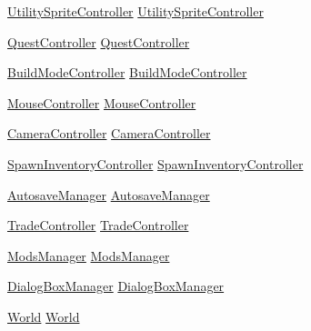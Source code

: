 \begin{DoxyCompactItemize}
\item 
\hyperlink{class_utility_sprite_controller}{Utility\+Sprite\+Controller} \hyperlink{class_world_controller_ade5c8157ae83db0367c11f9e8bbb5fb9}{Utility\+Sprite\+Controller}
\item 
\hyperlink{class_quest_controller}{Quest\+Controller} \hyperlink{class_world_controller_a8bd360e6ff51d5b2d3dffd19beafb0af}{Quest\+Controller}
\item 
\hyperlink{class_build_mode_controller}{Build\+Mode\+Controller} \hyperlink{class_world_controller_a5d914a05b2ad0e14c7612f48e850d91a}{Build\+Mode\+Controller}
\item 
\hyperlink{class_mouse_controller}{Mouse\+Controller} \hyperlink{class_world_controller_abf96a102fb4ae34e384a5970cd590c0b}{Mouse\+Controller}
\item 
\hyperlink{class_camera_controller}{Camera\+Controller} \hyperlink{class_world_controller_a16578baf61da3e9d18e543280d2b1f86}{Camera\+Controller}
\item 
\hyperlink{class_spawn_inventory_controller}{Spawn\+Inventory\+Controller} \hyperlink{class_world_controller_a06f2556c0b263655566adb7b58bbd061}{Spawn\+Inventory\+Controller}
\item 
\hyperlink{class_autosave_manager}{Autosave\+Manager} \hyperlink{class_world_controller_a47f20dc0e6593e64950ab9f6c0a2744d}{Autosave\+Manager}
\item 
\hyperlink{class_trade_controller}{Trade\+Controller} \hyperlink{class_world_controller_a4a1277c140cc46e9578809ecbd4c192d}{Trade\+Controller}
\item 
\hyperlink{class_mods_manager}{Mods\+Manager} \hyperlink{class_world_controller_a8d7943508d1d026430d6e57a3fda805a}{Mods\+Manager}
\item 
\hyperlink{class_dialog_box_manager}{Dialog\+Box\+Manager} \hyperlink{class_world_controller_a91a33de942311bdc45fa01def68f2a44}{Dialog\+Box\+Manager}
\item 
\hyperlink{class_world}{World} \hyperlink{class_world_controller_aa3b61545a41730beea4b3d0dfedb0574}{World}
\end{DoxyCompactItemize}


